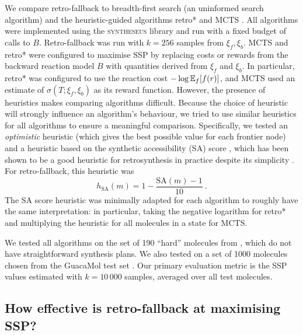We compare retro-fallback to breadth-first search (an uninformed search algorithm)
and the heuristic-guided algorithms retro* \citep{chen2020retro} and MCTS \citep{segler2018planning, genheden2020aizynthfinder, coley2019robotic}.
All algorithms were implemented
using the \textsc{syntheseus} library \citep{maziarz2023re}
and run with a fixed budget of calls to $B$.
Retro-fallback was run with $k=256$ samples from $\xi_f,\xi_b$.
MCTS and retro* were configured to maximise SSP by 
replacing costs or rewards from the backward reaction model $B$
with quantities derived from $\xi_f$ and $\xi_b$.
In particular, retro* was configured to use the reaction cost 
$-\log{\mathbb{E}_f[f(r)]}$,
and MCTS used an estimate of $\sigma(T;\xi_f,\xi_b)$ as its reward function.
However,
the presence of heuristics makes comparing algorithms difficult.
Because the choice of heuristic will strongly influence an algorithm's behaviour,
we tried to use similar heuristics for all algorithms
to ensure a meaningful comparison.
Specifically,
we tested an \emph{optimistic} heuristic
(which gives the best possible value for each frontier node)
and a heuristic based on the synthetic accessibility (SA) score \citep{ertl2009estimation},
which has been shown to be a good heuristic for retrosynthesis in practice
despite its simplicity \citep{skoraczynski2023critical}.
For retro-fallback, this heuristic was
\begin{equation*}
    h_\text{SA}(m) = 1 - \frac{\mathrm{SA}(m)-1}{10}\ .
\end{equation*}
The SA score heuristic was minimally adapted for each algorithm
to roughly have the same interpretation:
in particular, taking the negative logarithm for retro*
and multiplying the heuristic for all molecules in a state for MCTS.

We tested all algorithms on the set of 190 ``hard''
molecules from \citet{chen2020retro},
which do not have straightforward synthesis plans.
We also tested on a set of 1000 molecules chosen from the
GuacaMol test set \citep{brown2019guacamol}.
Our primary evaluation metric is the SSP values estimated with $k=10\,000$ samples,
averaged over all test molecules.

\subsection{How effective is retro-fallback at maximising SSP?}\label{sec:experiment:how effective is retro fallback}

